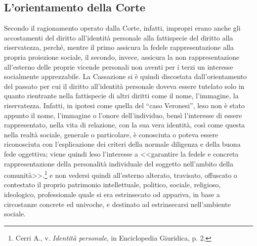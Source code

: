 \subsection{L'orientamento della Corte}
Secondo il ragionamento operato dalla Corte, infatti, impropri erano anche gli accostamenti del diritto all’identità personale alla fattispecie del diritto alla riservatezza, perché, mentre il primo assicura la fedele rappresentazione alla propria proiezione sociale, il secondo, invece, assicura la non rappresentazione all’esterno delle proprie vicende personali non aventi per i terzi un interesse socialmente apprezzabile. 
La Cassazione si è quindi discostata dall’orientamento del passato per cui il diritto all’identità personale doveva essere tutelato solo in quanto rientrante nella fattispecie di altri diritti come il nome, l’immagine, la riservatezza. Infatti, in ipotesi come quella del “caso Veronesi”, leso non è stato appunto il nome, l’immagine o l’onore dell’individuo, bensì l’interesse di essere rappresentato, nella vita di relazione, con la sua vera identità, così come questa nella realtà sociale, generale o particolare, è conosciuta o poteva essere riconosciuta con l'esplicazione dei criteri della normale diligenza e della buona fede oggettiva; viene quindi leso l'interesse a <<garantire la fedele e concreta rappresentazione della personalità individuale del soggetto nell'ambito della comunità>>.\footnote{Cerri A., v. \textit{Identità personale}, in Enciclopedia Giuridica,  p. 2.} e non vedersi quindi all'esterno alterato, travisato, offuscato o contestato il proprio patrimonio intellettuale, politico, sociale, religioso, ideologico, professionale quale si era estrinsecato od appariva, in base a circostanze concrete ed univoche, e destinato ad estrinsecarsi nell'ambiente sociale. 

